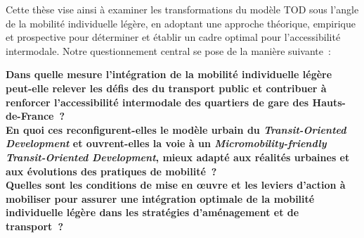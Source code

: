\begin{refsegment}
Cette thèse vise ainsi à examiner les transformations du modèle \acrshort{TOD} sous l'angle de la mobilité individuelle légère, en adoptant une approche théorique, empirique et prospective pour déterminer et établir un cadre optimal pour l'\gls{accessibilité intermodale}. Notre questionnement central se pose de la manière suivante~:
    \begin{displayquote}
\textbf{Dans quelle mesure l'intégration de la mobilité individuelle légère peut-elle relever les défis des  du transport public et contribuer à renforcer l'accessibilité intermodale des quartiers de gare des Hauts-de-France~?
\\
En quoi ces  reconfigurent-elles le modèle urbain du \textsl{Transit-Oriented Development} et ouvrent-elles la voie à un \textsl{Micromobility-friendly Transit-Oriented Development}, mieux adapté aux réalités urbaines et aux évolutions des pratiques de mobilité~?
\\
Quelles sont les conditions de mise en œuvre et les leviers d’action à mobiliser pour assurer une intégration optimale de la mobilité individuelle légère dans les stratégies d’aménagement et de transport~?}
    \end{displayquote}%


\end{refsegment}
